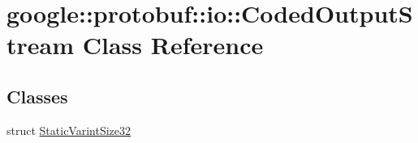 \hypertarget{classgoogle_1_1protobuf_1_1io_1_1CodedOutputStream}{}\section{google\+:\+:protobuf\+:\+:io\+:\+:Coded\+Output\+Stream Class Reference}
\label{classgoogle_1_1protobuf_1_1io_1_1CodedOutputStream}
\subsection*{Classes}
\begin{DoxyCompactItemize}
\item 
struct \hyperlink{structgoogle_1_1protobuf_1_1io_1_1CodedOutputStream_1_1StaticVarintSize32}{Static\+Varint\+Size32}
\end{DoxyCompactItemize}
